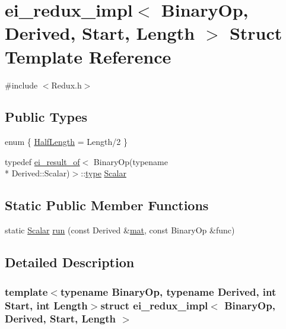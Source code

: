\hypertarget{structei__redux__impl}{\section{ei\-\_\-redux\-\_\-impl$<$ Binary\-Op, Derived, Start, Length $>$ Struct Template Reference}
\label{structei__redux__impl}
}


{\ttfamily \#include $<$Redux.\-h$>$}

\subsection*{Public Types}
\begin{DoxyCompactItemize}
\item 
enum \{ \hyperlink{structei__redux__impl_a07c73b7481e770c461fd353191d5de7caabc44127fa92123825fc549d84fb9aa6}{Half\-Length} = Length/2
 \}
\item 
typedef \hyperlink{structei__result__of}{ei\-\_\-result\-\_\-of}$<$ Binary\-Op(typename \\*
Derived\-::\-Scalar)$>$\-::\hyperlink{glext_8h_a7d05960f4f1c1b11f3177dc963a45d86}{type} \hyperlink{structei__redux__impl_a745e28ccec255fb10acd74ce4894bcfb}{Scalar}
\end{DoxyCompactItemize}
\subsection*{Static Public Member Functions}
\begin{DoxyCompactItemize}
\item 
static \hyperlink{structei__redux__impl_a745e28ccec255fb10acd74ce4894bcfb}{Scalar} \hyperlink{structei__redux__impl_ab5e91840c2e22f00e0ed37e7fc37532f}{run} (const Derived \&\hyperlink{uavobjecttemplate_8m_a16a51e808b16c46bbfd36da2e37cd123}{mat}, const Binary\-Op \&func)
\end{DoxyCompactItemize}


\subsection{Detailed Description}
\subsubsection*{template$<$typename Binary\-Op, typename Derived, int Start, int Length$>$struct ei\-\_\-redux\-\_\-impl$<$ Binary\-Op, Derived, Start, Length $>$}



